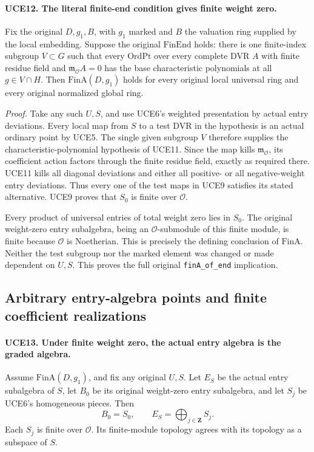\paragraph{UCE12. The literal finite-end condition gives finite weight zero.}
\label{claim:UCE12}
Fix the original \(D,g_1,B\), with \(g_1\) marked and \(B\)
the valuation ring supplied by the local embedding.  Suppose the
original \(\mathrm{FinEnd}\) holds: there is one finite-index
subgroup \(V\subset G\) such that every \(\mathrm{OrdPt}\)
over every complete DVR \(A\) with finite residue field and
\(\mathfrak m_{\mathcal O}A=0\) has the base characteristic
polynomials at all \(g\in V\cap H\).
Then \(\mathrm{FinA}(D,g_1)\) holds for every original local
universal ring and every original normalized global ring.

\emph{Proof.}
Take any such \(U,S\), and use UCE6's weighted presentation by
actual entry deviations.  Every local map from \(S\) to a test
DVR in the hypothesis is an actual ordinary point by UCE5.
The single given subgroup \(V\) therefore supplies the
characteristic-polynomial hypothesis of UCE11.  Since the map
kills \(\mathfrak m_{\mathcal O}\), its coefficient action
factors through the finite residue field, exactly as required there.
UCE11 kills all diagonal deviations and either all positive- or
all negative-weight entry deviations.  Thus every one of the
test maps in UCE9 satisfies its stated alternative.  UCE9 proves
that \(S_0\) is finite over \(\mathcal O\).

Every product of universal entries of total weight zero lies in
\(S_0\).  The original weight-zero entry subalgebra, being an
\(\mathcal O\)-submodule of this finite module, is finite because
\(\mathcal O\) is Noetherian.  This is precisely the defining
conclusion of \(\mathrm{FinA}\).  Neither the test subgroup nor
the marked element was changed or made dependent on \(U,S\).
This proves the full original \texttt{finA\_of\_end} implication.

\subsection{Arbitrary entry-algebra points and finite coefficient realizations}

\paragraph{UCE13. Under finite weight zero, the actual entry algebra is the graded algebra.}
\label{claim:UCE13}
Assume \(\mathrm{FinA}(D,g_1)\), and fix any original \(U,S\).
Let \(E_S\) be the actual entry subalgebra of \(S\), let
\(B_0\) be its original weight-zero entry subalgebra, and let
\(S_j\) be UCE6's homogeneous pieces.  Then
\[
                 B_0=S_0,\qquad E_S=\bigoplus_{j\in\mathbf Z}S_j.
 \tag{UCE.9}
\]
Each \(S_j\) is finite over \(\mathcal O\).  Its finite-module
topology agrees with its topology as a subspace of \(S\).

